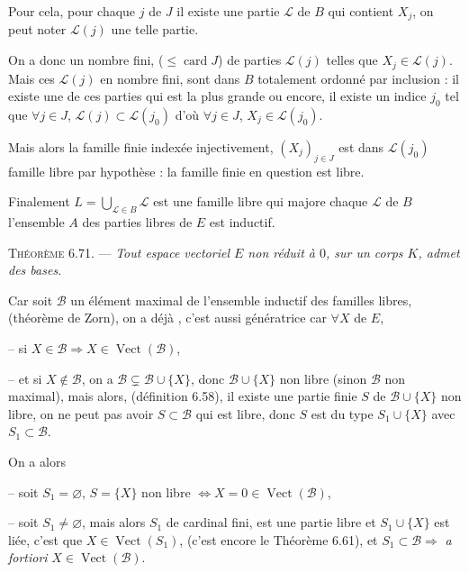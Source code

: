 Pour cela, pour chaque $j$ de $J$ il existe une partie $\mathcal L$ de $B$ qui contient $X_j$, on peut noter $\mathcal L(j)$ une telle partie.

On a donc un nombre fini, ($\le\operatorname{card}J$) de parties $\mathcal L(j)$ telles que $X_j\in\mathcal L(j)$. Mais ces $\mathcal L(j)$ en nombre fini, sont dans $B$ totalement ordonné par inclusion : il existe une de ces parties qui est la plus grande ou encore, il existe un indice $j_0$ tel que $\forall j\in J$, $\mathcal L(j)\subset\mathcal L(j_0)$ d'où $\forall j\in J$, $X_j\in\mathcal L(j_0)$.

Mais alors la famille finie indexée injectivement, $(X_j)_{j\in J}$ est dans $\mathcal L(j_0)$ famille libre par hypothèse : la famille finie en question est libre.

Finalement $L=\bigcup_{\mathcal L\in B}\mathcal L$ est une famille libre qui majore chaque $\mathcal L$ de $B$ l'ensemble $A$ des parties libres de $E$ est inductif. \bookend

\medskip\noindent\textsc{Théorème 6.71.} --- \emph{Tout espace vectoriel $E$ non réduit à $0$, sur un corps $K$, admet des bases.}

Car soit $\mathcal B$ un élément maximal de l'ensemble inductif des familles libres, (théorème de Zorn), on a déjà , c'est aussi génératrice car $\forall X$ de $E$,

-- si $X\in\mathcal B\Rightarrow X\in\operatorname{Vect}(\mathcal B)$,

-- et si $X\notin\mathcal B$, on a $\mathcal B\subsetneq\mathcal B\cup\{X\}$, donc $\mathcal B\cup\{X\}$ non libre (sinon $\mathcal B$ non maximal), mais alors, (définition 6.58), il existe une partie finie $S$ de $\mathcal B\cup\{X\}$ non libre, on ne peut pas avoir $S\subset\mathcal B$ qui est libre, donc $S$ est du type $S_1\cup\{X\}$ avec $S_1\subset\mathcal B$.

On a alors

-- soit $S_1=\varnothing$, $S=\{X\}$ non libre $\Longleftrightarrow X=0\in\operatorname{Vect}(\mathcal B)$,

-- soit $S_1\ne\varnothing$, mais alors $S_1$ de cardinal fini, est une partie libre et $S_1\cup\{X\}$ est liée, c'est que $X\in\operatorname{Vect}(S_1)$, (c'est encore le Théorème 6.61), et $S_1\subset\mathcal B\Rightarrow$ \emph{a fortiori} $X\in\operatorname{Vect}(\mathcal B)$.

